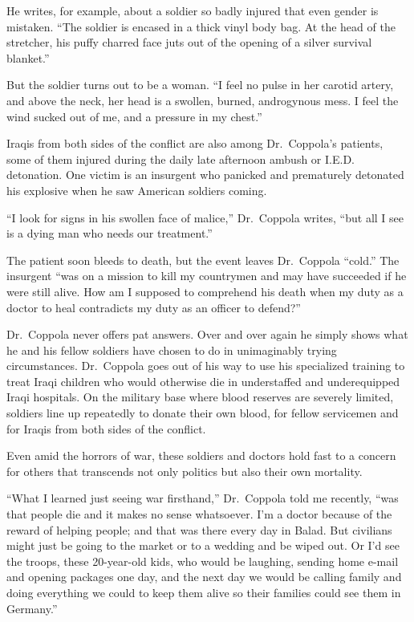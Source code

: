 ﻿\documentclass[12pt]{article}
\begin{document}
He writes, for example, about a soldier so badly injured that even gender is mistaken. ``The soldier
is encased in a thick vinyl body bag. At the head of the stretcher, his puffy charred face juts out
of the opening of a silver survival blanket.''

But the soldier turns out to be a woman. ``I feel no pulse in her carotid artery, and above the
neck, her head is a swollen, burned, androgynous mess. I feel the wind sucked out of me, and a
pressure in my chest.''

Iraqis from both sides of the conflict are also among Dr.~Coppola's patients, some of them injured
during the daily late afternoon ambush or I.E.D. detonation. One victim is an insurgent who panicked
and prematurely detonated his explosive when he saw American soldiers coming.

``I look for signs in his swollen face of malice,'' Dr.~Coppola writes, ``but all I see is a dying
man who needs our treatment.''

The patient soon bleeds to death, but the event leaves Dr.~Coppola ``cold.'' The insurgent ``was on
a mission to kill my countrymen and may have succeeded if he were still alive. How am I supposed to
comprehend his death when my duty as a doctor to heal contradicts my duty as an officer to defend?''

Dr.~Coppola never offers pat answers. Over and over again he simply shows what he and his fellow
soldiers have chosen to do in unimaginably trying circumstances. Dr.~Coppola goes out of his way to
use his specialized training to treat Iraqi children who would otherwise die in understaffed and
underequipped Iraqi hospitals. On the military base where blood reserves are severely limited,
soldiers line up repeatedly to donate their own blood, for fellow servicemen and for Iraqis from
both sides of the conflict.

Even amid the horrors of war, these soldiers and doctors hold fast to a concern for others that
transcends not only politics but also their own mortality.

``What I learned just seeing war firsthand,'' Dr.~Coppola told me recently, ``was that people die
and it makes no sense whatsoever. I'm a doctor because of the reward of helping people; and that was
there every day in Balad. But civilians might just be going to the market or to a wedding and be
wiped out. Or I'd see the troops, these 20-year-old kids, who would be laughing, sending home e-mail
and opening packages one day, and the next day we would be calling family and doing everything we
could to keep them alive so their families could see them in Germany.''
\end{document}

